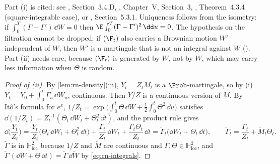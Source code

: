 Part (i) is cited: see \textcite{karatzas-shreve}, Section~3.4.D, \textcite{revuz-yor},
Chapter~V, Section~3, \textcite{oksendal}, Theorem~4.3.4 (square-integrable case), or
\textcite{shreve2}, Section~5.3.1. Uniqueness follows from the isometry: if
$\int_0^T(\Gamma-\Gamma')\,\dd W=0$ then $\E\int_0^T(\Gamma-\Gamma')^2\,\dd u=0$. The
hypothesis on the filtration cannot be dropped: if $(\F_t)$ also carries a Brownian motion
$W'$ independent of $W$, then $W'$ is a martingale that is not an integral against $W$
(). Part (ii) needs care, because $(\F_t)$ is generated by $W$, not
by $\widetilde W$, which may carry less information when $\Theta$ is random.

\begin{proof}[Proof of (ii)]
By \cref{lem:rn-density}(iii), $Y_t=Z_t\widetilde M_t$ is a $\Prob$-martingale, so by (i)
$Y_t=Y_0+\int_0^t\Gamma_u\,\dd W_u$, continuous. Then $Y/Z$ is a continuous version of
$\widetilde M$. By It\^o's formula for $e^x$, $1/Z_t=\exp\big(\int_0^t\Theta\,\dd
W+\frac12\int_0^t\Theta^2\,\dd u\big)$ satisfies $\dd(1/Z_t)=Z_t^{-1}(\Theta_t\,\dd
W_t+\Theta_t^2\,\dd t)$, and the product rule gives
\[
  \dd\Big(\frac{Y_t}{Z_t}\Big)=\frac{Y_t}{Z_t}\big(\Theta_t\,\dd W_t+\Theta_t^2\,\dd t\big)
  +\frac{\Gamma_t}{Z_t}\,\dd W_t+\frac{\Gamma_t\Theta_t}{Z_t}\,\dd t
  =\widetilde\Gamma_t\big(\dd W_t+\Theta_t\,\dd t\big),\qquad
  \widetilde\Gamma_t=\frac{\Gamma_t}{Z_t}+\widetilde M_t\Theta_t .
\]
$\widetilde\Gamma$ is in $\mathbb H^2_{\mathrm{loc}}$ because $1/Z$ and $\widetilde M$ are
continuous and $\Gamma,\Theta\in\mathbb H^2_{\mathrm{loc}}$, and
$\widetilde\Gamma\,(\dd W+\Theta\,\dd t)=\widetilde\Gamma\,\dd\widetilde W$ by
\eqref{eq:rn-integrals}.
\end{proof}

